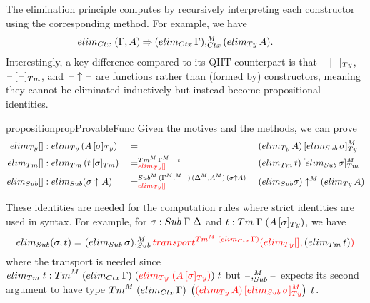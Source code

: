 \documentclass[a4paper,UKenglish,numberwithinsect,cleveref,thm-restate]{lipics-v2021}
\begin{document}
The elimination principle computes by recursively interpreting each constructor using the corresponding method. For example, we have
\begin{alignat*}{5}
  \elim_{\Ctx}\;(\Gamma, A) & \reduce (\elim_{\Ctx}\,\Gamma),_{\Ctx}^{M} (\elim_{\Ty}\,A) . && %
\end{alignat*}
%
Interestingly, a key difference compared to its QIIT counterpart is that $\subTy{\blank}{\blank}$, $\subTm{\blank}{\blank}$, and $\mathord{\hspace{1pt}\text{--}\hspace{1pt}}\uparrow\mathord{\hspace{1pt}\text{--}\hspace{1pt}}$ are functions rather than (formed by) constructors, meaning they cannot be eliminated inductively but instead become propositional identities.
\begin{restatable}{proposition}{propProvableFunc}\label{prop:provable-function-clauses}
  Given the motives and the methods, we can prove
\begin{alignat*}{5}
  \elim_{\Ty}[] & : \elim_{\Ty}\,(\subTy{A}{\sigma}) && = && \subTyM{(\elim_{\Ty}\,A)}{\elim_{\Sub}\,\sigma} \\
  \elim_{\Tm}[] & : \elim_{\Tm}\,(\subTm{t}{\sigma}) && =^{\Tm^M\,\Gamma^M\,\blank\,t}_{\alert{\elim_{\Ty}[]}} {} && \subTmM{(\elim_{\Tm}\,t)}{\elim_{\Sub}\,\sigma} \\
  \elim_{\Sub}[] & : \elim_{\Sub}(\sigma\uparrow A) && =^{\Sub^M\,(\Gamma^M,^M \blank)\,(\Delta^M, A^M)\,(\sigma \uparrow A)}_{\alert{\elim_{\Ty}[]}} {} && (\elim_{\Sub} \sigma) \uparrow^M (\elim_{\Ty}\,A)
\end{alignat*}
\end{restatable}

These identities are needed for the computation rules where strict identities are used in syntax.
For example, for $\sigma : \Sub\;\Gamma\;\Delta$ and $t : \Tm\;\Gamma\;(\subTy{A}{\sigma})$, we have 
\[
  \elim_{\Sub}(\sigma, t) = (\elim_{\Sub}\,\sigma) ,_{\Sub}^M \alert{\transfib{\Tm^M\;(\elim_{\Ctx}\,\Gamma)}{\elim_{\Ty}[]}{\color{black}(\elim_{\Tm}\,t)}}
\]
where the transport is needed since $\elim_{\Tm}\;t : \Tm^M\;(\elim_{\Ctx}\,\Gamma)\;(\alert{\elim_{\Ty}\;(\subTy{A}{\sigma})})\;t$ but $\blank ,_{\Sub}^M \blank$ expects its second argument to have type $\Tm^M\;(\elim_{\Ctx}\,\Gamma)\;\left(\alert{\subTyM{(\elim_{\Ty}\,A)}{\elim_{\Sub}\,\sigma}}\right)\;t$.
\end{document}
